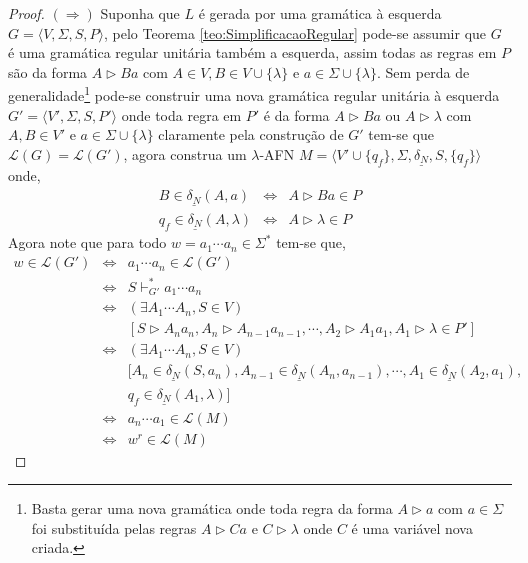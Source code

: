 \begin{proof}
	$(\Rightarrow)$ Suponha que $L$ é gerada por uma gramática à esquerda $G = \langle V, \Sigma, S, P \rangle$, pelo Teorema \ref{teo:SimplificacaoRegular} pode-se assumir que $G$ é uma gramática regular unitária também a esquerda, assim todas as regras em $P$ são da forma $A \rhd Ba$ com $A \in V, B \in V \cup \{\lambda\}$ e $a \in \Sigma \cup \{\lambda\}$. Sem perda de generalidade\footnote{Basta gerar uma nova gramática onde toda regra da forma $A \rhd a$ com $a \in \Sigma$ foi substituída pelas regras $A \rhd Ca$ e $C \rhd \lambda$ onde $C$ é uma variável nova criada.} pode-se construir uma nova gramática regular unitária à esquerda $G' = \langle V', \Sigma, S, P'\rangle$ onde toda regra em $P'$ é da forma $A \rhd Ba$ ou $A \rhd \lambda$ com $A, B \in V'$ e $a \in \Sigma \cup \{\lambda\}$ claramente pela construção de $G'$ tem-se que $\mathcal{L}(G) = \mathcal{L}(G')$, agora construa um $\lambda$-AFN $M = \langle V' \cup \{q_f\}, \Sigma, \underline{\delta_N}, S, \{q_f\} \rangle$ onde, 
	\begin{eqnarray*}
		B \in \underline{\delta_N}(A, a) & \Longleftrightarrow & A \rhd Ba \in P\\
		q_f \in \underline{\delta_N}(A, \lambda)& \Longleftrightarrow & A \rhd \lambda \in P
	\end{eqnarray*} 
	Agora note que para todo $w = a_1\cdots a_n \in \Sigma^*$ tem-se que,
	\begin{eqnarray*}
		w \in \mathcal{L}(G') & \Longleftrightarrow &  a_1\cdots a_n \in \mathcal{L}(G')\\
		& \Longleftrightarrow & S \vdash_{G'}^* a_1\cdots a_n\\
		& \Longleftrightarrow & (\exists A_1 \cdots A_n, S \in V)\\
		& & [S \rhd A_na_n, A_n \rhd A_{n-1}a_{n-1}, \cdots, A_{2} \rhd A_1a_1, A_1 \rhd \lambda \in P']\\
		& \Longleftrightarrow & (\exists A_1 \cdots A_n, S \in V)\\
		& & [A_n \in \underline{\delta_N}(S, a_n), A_{n-1} \in \underline{\delta_N}(A_n, a_{n-1}), \cdots,  A_{1} \in \underline{\delta_N}(A_2, a_{1}), \\
		& &  q_f \in \underline{\delta_N}(A_1, \lambda)]\\
		& \Longleftrightarrow & a_n\cdots a_1 \in \mathcal{L}(M)\\
		& \Longleftrightarrow & w^r \in \mathcal{L}(M)
	\end{eqnarray*}

\end{proof}
